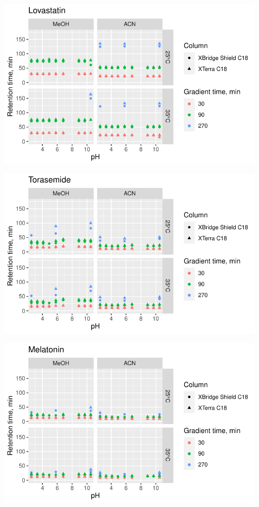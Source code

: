 \documentclass[
  letterpaper,
  DIV=11,
  numbers=noendperiod]{scrreprt}
\begin{document}
\includegraphics{index_files/figure-pdf/unnamed-chunk-4-60.pdf}

\includegraphics{index_files/figure-pdf/unnamed-chunk-4-61.pdf}

\includegraphics{index_files/figure-pdf/unnamed-chunk-4-62.pdf}
\end{document}
